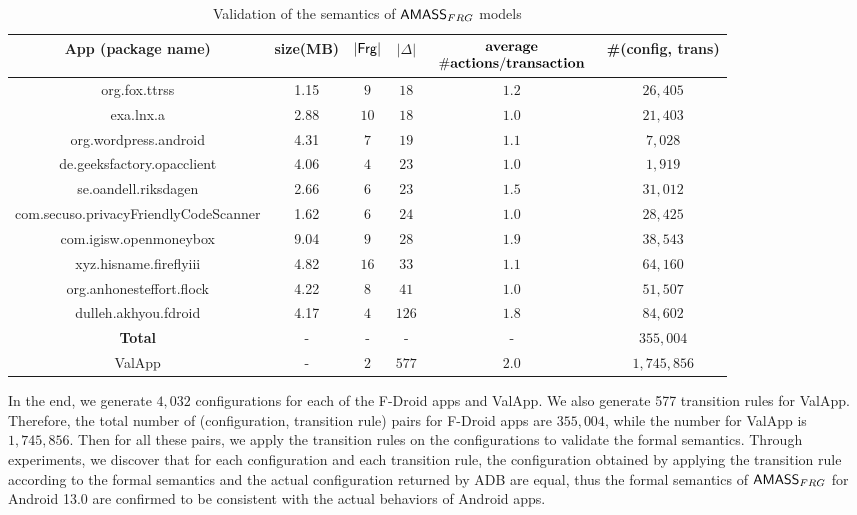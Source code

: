%
\begin{table}
    \centering
    \begin{tabular}{|c|c|c|c|c|c|}
    \hline
    \textbf{App (package name)} & size(MB) & $|{\sf Frg}|$ & $|\Delta|$ & $\begin{array}{c} {\bf average} \\ {\bf \#actions/transaction} \end{array}$ & \textbf{\#(config, trans)} \\
    \hline
    org.fox.ttrss & 1.15 & $9$ & $18$ & $1.2$ & $26,405$ \\
    \hline
    exa.lnx.a & 2.88 &  $10$ & $18$ & $1.0$ & $21,403$ \\
    \hline
    org.wordpress.android & 4.31 & $7$ & $19$ & $1.1$ & $7,028$  \\
    \hline
    de.geeksfactory.opacclient & 4.06 &  $4$ & $23$ & $1.0$ & $1,919$  \\
    \hline
    se.oandell.riksdagen & 2.66 &  $6$ & $23$ & $1.5$ & $31,012$  \\
    \hline
    com.secuso.privacyFriendlyCodeScanner & 1.62 &  $6$ & $24$ & $1.0$ & $28,425$  \\
    \hline
    com.igisw.openmoneybox & 9.04 & $9$ & $28$ & $1.9$ & $38,543$  \\
    \hline
    xyz.hisname.fireflyiii & 4.82 & $16$ & $33$ & $1.1$ & $64,160$  \\
    \hline
    org.anhonesteffort.flock & 4.22 & $8$ & $41$ & $1.0$ & $51,507$  \\
    \hline
    dulleh.akhyou.fdroid & 4.17 & $4$ & $126$ & $1.8$ & $84,602$ \\
    \hline
    {\textbf{Total}} & - & - & - & - & $355,004$  \\
    \hline
    ValApp & - & $2$ & $577$ & $2.0$ & $1,745,856$\\
    \hline
    \end{tabular}
    \caption{Validation of the semantics of $\textsf{AMASS}_{FRG}$ models}
    \label{tab-val-frag}
\end{table}
In the end, we generate $4,032$ configurations for each of the F-Droid apps and ValApp. 
We also generate 577 transition rules for ValApp. 
Therefore, the total number of (configuration, transition rule) pairs for F-Droid apps are $355,004$, while the number for ValApp is $1,745,856$. 
Then for all these pairs, we apply the transition rules on the configurations to validate the formal semantics. Through experiments, we discover that for each configuration and each transition rule, the configuration obtained by applying the transition rule according to the formal semantics and the actual configuration returned by ADB are equal, thus the formal semantics of $\textsf{AMASS}_{FRG}$ for Android 13.0 are confirmed to be consistent with the actual behaviors of Android apps.  


